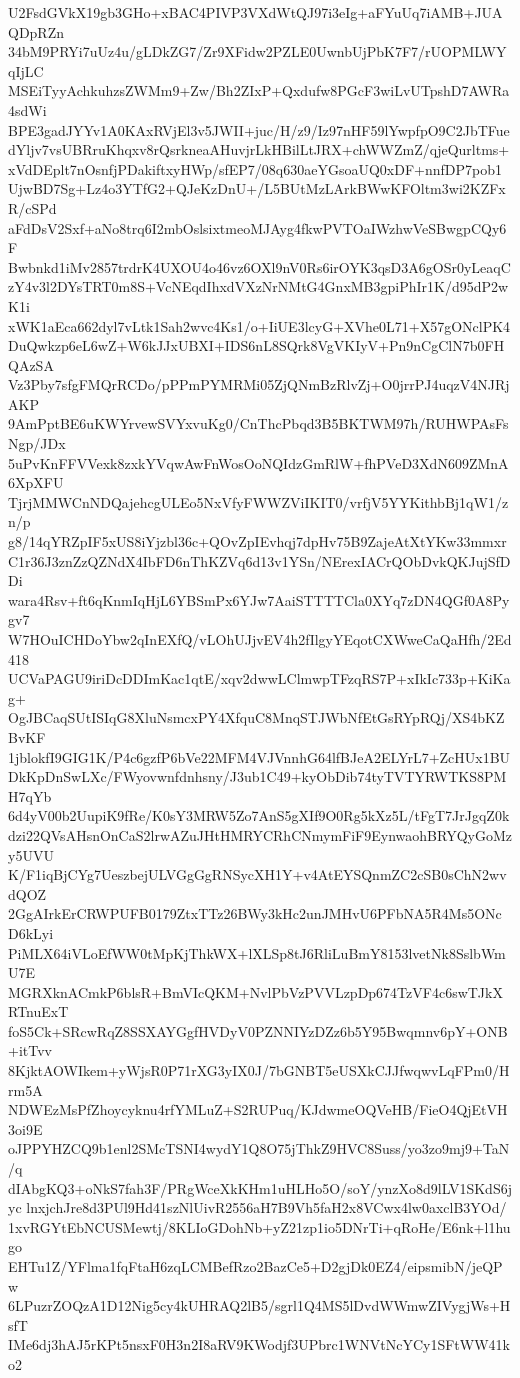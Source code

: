 U2FsdGVkX19gb3GHo+xBAC4PIVP3VXdWtQJ97i3eIg+aFYuUq7iAMB+JUAQDpRZn
34bM9PRYi7uUz4u/gLDkZG7/Zr9XFidw2PZLE0UwnbUjPbK7F7/rUOPMLWYqIjLC
MSEiTyyAchkuhzsZWMm9+Zw/Bh2ZIxP+Qxdufw8PGcF3wiLvUTpshD7AWRa4sdWi
BPE3gadJYYv1A0KAxRVjEl3v5JWII+juc/H/z9/Iz97nHF59lYwpfpO9C2JbTFue
dYljv7vsUBRruKhqxv8rQsrkneaAHuvjrLkHBilLtJRX+chWWZmZ/qjeQurltms+
xVdDEplt7nOsnfjPDakiftxyHWp/sfEP7/08q630aeYGsoaUQ0xDF+nnfDP7pob1
UjwBD7Sg+Lz4o3YTfG2+QJeKzDnU+/L5BUtMzLArkBWwKFOltm3wi2KZFxR/cSPd
aFdDsV2Sxf+aNo8trq6I2mbOslsixtmeoMJAyg4fkwPVTOaIWzhwVeSBwgpCQy6F
Bwbnkd1iMv2857trdrK4UXOU4o46vz6OXl9nV0Rs6irOYK3qsD3A6gOSr0yLeaqC
zY4v3l2DYsTRT0m8S+VcNEqdIhxdVXzNrNMtG4GnxMB3gpiPhIr1K/d95dP2wK1i
xWK1aEca662dyl7vLtk1Sah2wvc4Ks1/o+IiUE3lcyG+XVhe0L71+X57gONclPK4
DuQwkzp6eL6wZ+W6kJJxUBXI+IDS6nL8SQrk8VgVKIyV+Pn9nCgClN7b0FHQAzSA
Vz3Pby7sfgFMQrRCDo/pPPmPYMRMi05ZjQNmBzRlvZj+O0jrrPJ4uqzV4NJRjAKP
9AmPptBE6uKWYrvewSVYxvuKg0/CnThcPbqd3B5BKTWM97h/RUHWPAsFsNgp/JDx
5uPvKnFFVVexk8zxkYVqwAwFnWosOoNQIdzGmRlW+fhPVeD3XdN609ZMnA6XpXFU
TjrjMMWCnNDQajehcgULEo5NxVfyFWWZViIKIT0/vrfjV5YYKithbBj1qW1/zn/p
g8/14qYRZpIF5xUS8iYjzbl36c+QOvZpIEvhqj7dpHv75B9ZajeAtXtYKw33mmxr
C1r36J3znZzQZNdX4IbFD6nThKZVq6d13v1YSn/NErexIACrQObDvkQKJujSfDDi
wara4Rsv+ft6qKnmIqHjL6YBSmPx6YJw7AaiSTTTTCla0XYq7zDN4QGf0A8Pygv7
W7HOuICHDoYbw2qInEXfQ/vLOhUJjvEV4h2fIlgyYEqotCXWweCaQaHfh/2Ed418
UCVaPAGU9iriDcDDImKac1qtE/xqv2dwwLClmwpTFzqRS7P+xIkIc733p+KiKag+
OgJBCaqSUtISIqG8XluNsmcxPY4XfquC8MnqSTJWbNfEtGsRYpRQj/XS4bKZBvKF
1jblokfI9GIG1K/P4c6gzfP6bVe22MFM4VJVnnhG64lfBJeA2ELYrL7+ZcHUx1BU
DkKpDnSwLXc/FWyovwnfdnhsny/J3ub1C49+kyObDib74tyTVTYRWTKS8PMH7qYb
6d4yV00b2UupiK9fRe/K0sY3MRW5Zo7AnS5gXIf9O0Rg5kXz5L/tFgT7JrJgqZ0k
dzi22QVsAHsnOnCaS2lrwAZuJHtHMRYCRhCNmymFiF9EynwaohBRYQyGoMzy5UVU
K/F1iqBjCYg7UeszbejULVGgGgRNSycXH1Y+v4AtEYSQnmZC2cSB0sChN2wvdQOZ
2GgAIrkErCRWPUFB0179ZtxTTz26BWy3kHc2unJMHvU6PFbNA5R4Ms5ONcD6kLyi
PiMLX64iVLoEfWW0tMpKjThkWX+lXLSp8tJ6RliLuBmY8153lvetNk8SslbWmU7E
MGRXknACmkP6blsR+BmVIcQKM+NvlPbVzPVVLzpDp674TzVF4c6swTJkXRTnuExT
foS5Ck+SRcwRqZ8SSXAYGgfHVDyV0PZNNIYzDZz6b5Y95Bwqmnv6pY+ONB+itTvv
8KjktAOWIkem+yWjsR0P71rXG3yIX0J/7bGNBT5eUSXkCJJfwqwvLqFPm0/Hrm5A
NDWEzMsPfZhoycyknu4rfYMLuZ+S2RUPuq/KJdwmeOQVeHB/FieO4QjEtVH3oi9E
oJPPYHZCQ9b1enl2SMcTSNI4wydY1Q8O75jThkZ9HVC8Suss/yo3zo9mj9+TaN/q
dIAbgKQ3+oNkS7fah3F/PRgWceXkKHm1uHLHo5O/soY/ynzXo8d9lLV1SKdS6jyc
lnxjchJre8d3PUl9Hd41szNlUivR2556aH7B9Vh5faH2x8VCwx4lw0axclB3YOd/
1xvRGYtEbNCUSMewtj/8KLIoGDohNb+yZ21zp1io5DNrTi+qRoHe/E6nk+l1hugo
EHTu1Z/YFlma1fqFtaH6zqLCMBefRzo2BazCe5+D2gjDk0EZ4/eipsmibN/jeQPw
6LPuzrZOQzA1D12Nig5cy4kUHRAQ2lB5/sgrl1Q4MS5lDvdWWmwZIVygjWs+HsfT
IMe6dj3hAJ5rKPt5nsxF0H3n2I8aRV9KWodjf3UPbrc1WNVtNcYCy1SFtWW41ko2
